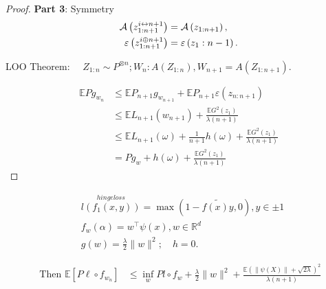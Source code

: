 \documentclass[twoside]{article}
\begin{document}
\begin{proof}
\noindent \textbf{Part 3}: Symmetry \\

$$
\begin{aligned}
\mathcal{A} \left(z_{1: n+1}^{i \leftrightarrow n+1}\right) &= \mathcal{A} \left(z_{1: n+1}\right), \\
\varepsilon\left(z_{1: n+1}^{i \oplus n+1}\right) &= \varepsilon\left(z_{1}: n-1\right) .
\end{aligned}
$$

LOO Theorem: $\quad Z_{1: n} \sim P^{\otimes n} ; W_{n}: A\left(Z_{1: n}\right), W_{n+1}=A\left(Z_{1: n+1}\right)$.

$$
\begin{aligned}
\mathbb{E} P g_{w_{n}} & \leq \mathbb{E} P_{n+1} g_{w_{n+1}}+\mathbb{E} P_{n+1} \varepsilon\left(z_{n: n+1}\right) \\
& \leq \mathbb{E} L_{n+1}\left(w_{n+1}\right)+\frac{\mathbb{E} G^{2}\left(z_{1}\right)}{\lambda(n+1)} \\
& \leq \mathbb{E} L_{n+1}(\omega)+\frac{1}{n+1} h(\omega)+\frac{\mathbb{E} G^{2}\left(z_{1}\right)}{\lambda(n+1)} \\
& =P g_{w}+h(\omega) +\frac{\mathbb{E} G^{2}\left(z_{1}\right)}{\lambda(n+1)}
\end{aligned}
$$

\end{proof}
\newpage 

$$
\begin{aligned}
& \overset{hinge loss} {l\left(f_{1}(x, y)\right)}=\max (1-\tilde{f(x) y}, 0), y \in {\pm 1} \\
& f_{w}(\alpha)=w^{\top} \psi(x), w \in \mathbb{R}^{d} \\
& g(w)=\frac{\lambda}{2}\|w\|^{2} ; \quad h=0 .
\end{aligned}
$$

$$
\begin{aligned}
\text { Then } \mathbb{E} \left[ P \ell \circ f_{w_{n}} \right] 
 &\leq \inf _{w} P l \circ f_{w}+\frac{\lambda}{2}\|w\|^{2}+ \frac{\mathbb{E}\left( \left\| \psi(X) \right\| + \sqrt{2\lambda} \right)^2}{\lambda (n+1)}
\\
\end{aligned}
$$
\end{document}
